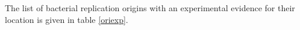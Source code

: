 \documentclass{article}
\begin{document}

The list of bacterial replication origins with an experimental
evidence for their location is given in table \ref{oriexp}.


\end{document}
